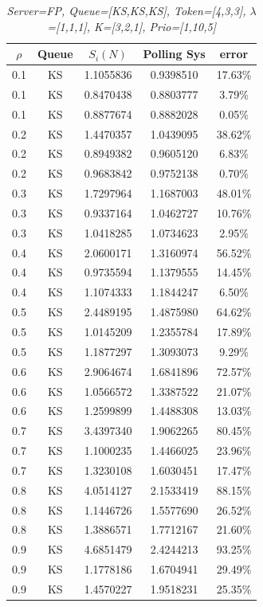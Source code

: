 \documentclass[12pt,a4paper,italian]{article}
\begin{document}
\begin{table}[ht!]
	\begin{minipage}[b]{0.48\linewidth}\centering
		\centering
		\caption{\scriptsize \emph{Server=FP, Queue=[KS,KS,KS], Token=[4,3,3], $\lambda$=[1,1,1], K=[3,2,1], Prio=[1,10,5] }}
		\label{tab15}
		\tiny
		\begin{tabular}{c c c c c}
			\hline
			$\rho$ & Queue & $S_i(N)$ & Polling Sys & error \\ \hline
			0.1 & KS & 1.1055836 &   0.9398510    & 17.63\% \\
			0.1 & KS & 0.8470438 &   0.8803777    & 3.79\%  \\
			0.1 & KS & 0.8877674 &   0.8882028    & 0.05\%  \\ \hline \hline
			0.2 & KS & 1.4470357 &   1.0439095    & 38.62\% \\
			0.2 & KS & 0.8949382 &   0.9605120    & 6.83\%  \\
			0.2 & KS & 0.9683842 &   0.9752138    & 0.70\%  \\ \hline \hline
			0.3 & KS & 1.7297964 &   1.1687003    & 48.01\% \\
			0.3 & KS & 0.9337164 &   1.0462727    & 10.76\% \\
			0.3 & KS & 1.0418285 &   1.0734623    & 2.95\%  \\ \hline \hline
			0.4 & KS & 2.0600171 &   1.3160974    & 56.52\% \\
			0.4 & KS & 0.9735594 &   1.1379555    & 14.45\% \\
			0.4 & KS & 1.1074333 &   1.1844247    & 6.50\%  \\ \hline \hline
			0.5 & KS & 2.4489195 &   1.4875980    & 64.62\% \\
			0.5 & KS & 1.0145209 &   1.2355784    & 17.89\% \\
			0.5 & KS & 1.1877297 &   1.3093073    & 9.29\%  \\ \hline \hline
			0.6 & KS & 2.9064674 &   1.6841896    & 72.57\% \\
			0.6 & KS & 1.0566572 &   1.3387522    & 21.07\% \\
			0.6 & KS & 1.2599899 &   1.4488308    & 13.03\% \\ \hline \hline
			0.7 & KS & 3.4397340 &   1.9062265    & 80.45\% \\
			0.7 & KS & 1.1000235 &   1.4466025    & 23.96\% \\
			0.7 & KS & 1.3230108 &   1.6030451    & 17.47\% \\ \hline \hline
			0.8 & KS & 4.0514127 &   2.1533419    & 88.15\% \\
			0.8 & KS & 1.1446726 &   1.5577690    & 26.52\% \\
			0.8 & KS & 1.3886571 &   1.7712167    & 21.60\% \\ \hline \hline
			0.9 & KS & 4.6851479 &   2.4244213    & 93.25\% \\
			0.9 & KS & 1.1778186 &   1.6704941    & 29.49\% \\
			0.9 & KS & 1.4570227 &   1.9518231    & 25.35\% \\\hline
			

\end{tabular}
\end{minipage}
\end{table}
\end{document}
